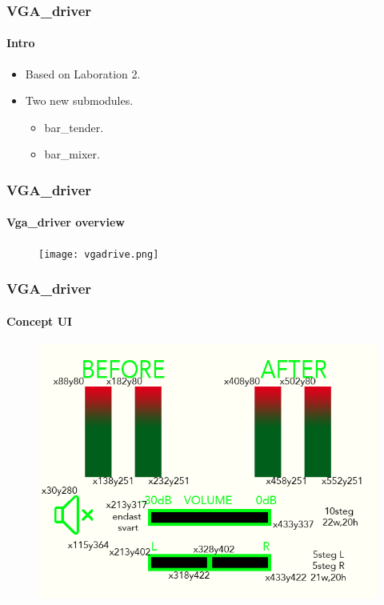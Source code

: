 
\begin{frame}
  \frametitle{VGA\_driver}
  \framesubtitle{Intro}
  \begin{itemize}
  \item<1-> Based on Laboration 2.
  \item<2-> Two new submodules.
    \begin{itemize}
    \item<3-> bar\_tender.
    \item<4-> bar\_mixer.
    \end{itemize}
  \end{itemize}
\end{frame}




\begin{frame}
  \frametitle{VGA\_driver}
  \framesubtitle{Vga\_driver overview}
  \begin{figure}[h]
    \centering 
    \texttt{[image: vgadrive.png]} 
    \label{fig:vgadrive.png}
  \end{figure}
\end{frame}

\begin{frame}
  \frametitle{VGA\_driver}
  \framesubtitle{Concept UI}
  \begin{figure}[h]
    \centering 
    \includegraphics[scale=0.80]{picture_xy.png} 
    \label{fig:picture_xy.png}
  \end{figure}
\end{frame}

